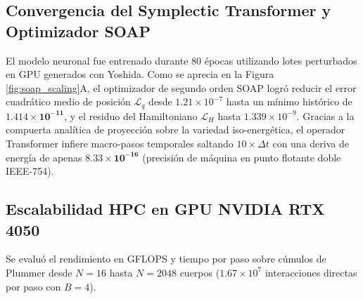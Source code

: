 \documentclass[11pt,a4paper]{article}
\begin{document}
\subsection{Convergencia del Symplectic Transformer y Optimizador SOAP}
El modelo neuronal fue entrenado durante 80 épocas utilizando lotes perturbados en GPU generados con Yoshida. Como se aprecia en la Figura \ref{fig:soap_scaling}A, el optimizador de segundo orden SOAP logró reducir el error cuadrático medio de posición $\mathcal{L}_q$ desde $1.21 \times 10^{-7}$ hasta un mínimo histórico de $\mathbf{1.414 \times 10^{-11}}$, y el residuo del Hamiltoniano $\mathcal{L}_H$ hasta $1.339 \times 10^{-9}$. Gracias a la compuerta analítica de proyección sobre la variedad iso-energética, el operador Transformer infiere macro-pasos temporales saltando $10\times \Delta t$ con una deriva de energía de apenas $\mathbf{8.33 \times 10^{-16}}$ (precisión de máquina en punto flotante doble IEEE-754).

\subsection{Escalabilidad HPC en GPU NVIDIA RTX 4050}
Se evaluó el rendimiento en GFLOPS y tiempo por paso sobre cúmulos de Plummer desde $N = 16$ hasta $N = 2048$ cuerpos ($1.67 \times 10^7$ interacciones directas por paso con $B=4$).

\begin{table}[H]
\centering
\small
\caption{Escalabilidad temporal y rendimiento HPC (GPU NVIDIA RTX 4050 vs. CPU).}
\label{tab:scaling_gpu}
\end{table}
\end{document}
